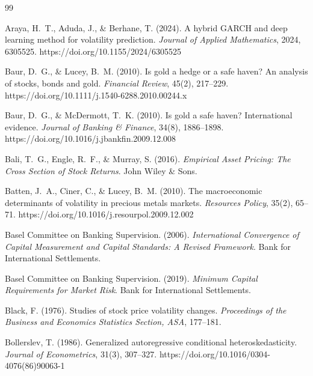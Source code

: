 \documentclass[12pt,a4paper]{article}
\begin{document}





\begingroup
\singlespacing
\small
\begin{thebibliography}{99}

Araya, H.~T., Aduda, J., \& Berhane, T. (2024). A hybrid GARCH and deep learning method for volatility prediction. \textit{Journal of Applied Mathematics}, 2024, 6305525. https://doi.org/10.1155/2024/6305525

Baur, D.~G., \& Lucey, B.~M. (2010). Is gold a hedge or a safe haven? An analysis of stocks, bonds and gold. \textit{Financial Review}, 45(2), 217--229. https://doi.org/10.1111/j.1540-6288.2010.00244.x

Baur, D.~G., \& McDermott, T.~K. (2010). Is gold a safe haven? International evidence. \textit{Journal of Banking \& Finance}, 34(8), 1886--1898. https://doi.org/10.1016/j.jbankfin.2009.12.008

Bali, T.~G., Engle, R.~F., \& Murray, S. (2016). \textit{Empirical Asset Pricing: The Cross Section of Stock Returns}. John Wiley \& Sons.

Batten, J.~A., Ciner, C., \& Lucey, B.~M. (2010). The macroeconomic determinants of volatility in precious metals markets. \textit{Resources Policy}, 35(2), 65--71. https://doi.org/10.1016/j.resourpol.2009.12.002

Basel Committee on Banking Supervision. (2006). \textit{International Convergence of Capital Measurement and Capital Standards: A Revised Framework}. Bank for International Settlements.

Basel Committee on Banking Supervision. (2019). \textit{Minimum Capital Requirements for Market Risk}. Bank for International Settlements.

Black, F. (1976). Studies of stock price volatility changes. \textit{Proceedings of the Business and Economics Statistics Section, ASA}, 177--181.

Bollerslev, T. (1986). Generalized autoregressive conditional heteroskedasticity. \textit{Journal of Econometrics}, 31(3), 307--327. https://doi.org/10.1016/0304-4076(86)90063-1


\end{thebibliography}
\end{document}
